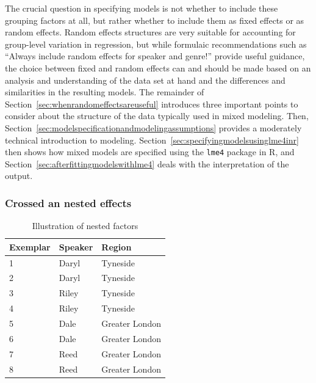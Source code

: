 \documentclass[a4paper,12pt]{article}
\begin{document}
The crucial question in specifying models is not whether to include these grouping factors at all, but rather whether to include them as fixed effects or as random effects.
Random effects structures are very suitable for accounting for group-level variation in regression, but while formulaic recommendations such as ``Always include random effects for speaker and genre!'' provide useful guidance, the choice between fixed and random effects can and should be made based on an analysis and understanding of the data set at hand and the differences and similarities in the resulting models.
The remainder of Section~\ref{sec:whenrandomeffectsareuseful} introduces three important points to consider about the structure of the data typically used in mixed modeling.
Then, Section~\ref{sec:modelspecificationandmodelingassumptions} provides a moderately technical introduction to modeling.
Section~\ref{sec:specifyingmodelsusinglme4inr} then shows how mixed models are specified using the \texttt{lme4} package in R, and Section~\ref{sec:afterfittingmodelswithlme4} deals with the interpretation of the output.


\subsubsection{Crossed an nested effects}
\label{sec:crossedandnestedeffects}

\begin{table}
  \centering
  \begin{tabular}{lll}
    \toprule
    \textbf{Exemplar} & \textbf{Speaker}  & \textbf{Region}        \\
    \midrule
                    1 &           Daryl  &         Tyneside       \\
                    2 &           Daryl  &         Tyneside       \\
                    3 &           Riley  &         Tyneside       \\
                    4 &           Riley  &         Tyneside       \\
                    5 &           Dale   &         Greater London \\
                    6 &           Dale   &         Greater London \\
                    7 &           Reed   &         Greater London \\
                    8 &           Reed   &         Greater London \\
    \bottomrule
  \end{tabular}
  \caption{Illustration of nested factors}
  \label{tab:nested}
\end{table}
\end{document}
